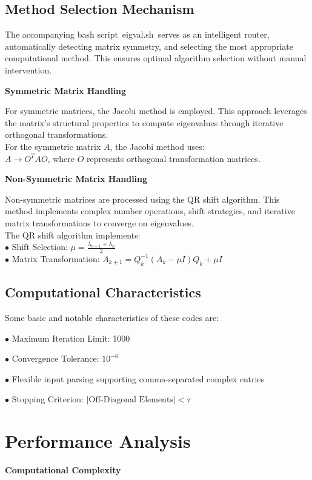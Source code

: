 \documentclass[a4paper,12pt]{article}
\begin{document}
\subsection{Method Selection Mechanism}
The accompanying bash script\ \textlangle eigval.sh\textrangle\  serves as an intelligent router, automatically detecting matrix symmetry, and selecting the most appropriate computational method. This ensures optimal algorithm selection without manual intervention.

\noindent\textbf{Symmetric Matrix Handling}

For symmetric matrices, the Jacobi method is employed. This approach leverages the matrix's structural properties to compute eigenvalues through iterative orthogonal transformations.\\
For the symmetric matrix $A$, the Jacobi method uses:\\
$A \rightarrow O^T A O$, where $O$ represents orthogonal transformation matrices.

\noindent\textbf{Non-Symmetric Matrix Handling}

Non-symmetric matrices are processed using the QR shift algorithm. This method implements complex number operations, shift strategies, and iterative matrix transformations to converge on eigenvalues.\\ The QR shift algorithm implements:\\
$\bullet$ Shift Selection: $\mu = \frac{\lambda_{n-1} + \lambda_n}{2}$\\
$\bullet$ Matrix Transformation: $A_{k+1} = Q_k^{-1} (A_k - \mu I) Q_k + \mu I$

\subsection{Computational Characteristics}
Some basic and notable characteristics of these codes are:

$\bullet$ Maximum Iteration Limit: 1000

$\bullet$ Convergence Tolerance: $10^{-6}$

$\bullet$ Flexible input parsing supporting comma-separated complex entries

$\bullet$ Stopping Criterion: $|\text{Off-Diagonal Elements}| < \tau$

\section{Performance Analysis}
\noindent\textbf{Computational Complexity}
\end{document}
